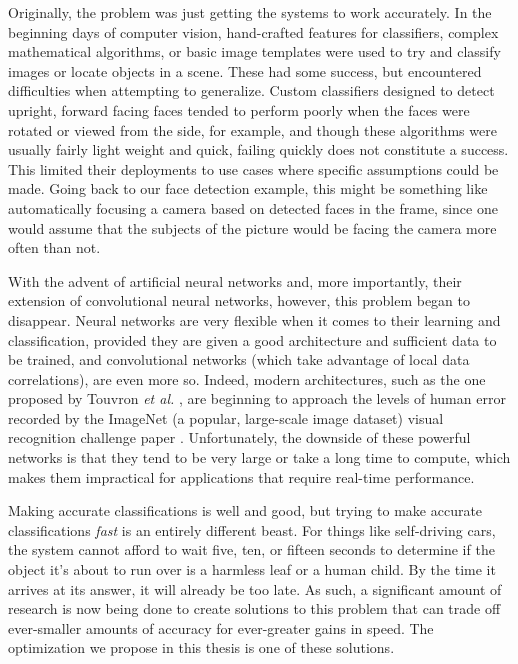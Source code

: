 \documentclass[11pt,a4paper,oldfontcommands]{memoir}
\begin{document}
Originally, the problem was just getting the systems to work accurately. In the beginning days of computer vision, hand-crafted features for classifiers, complex mathematical algorithms, or basic image templates were used to try and classify images or locate objects in a scene. These had some success, but encountered difficulties when attempting to generalize. Custom classifiers designed to detect upright, forward facing faces tended to perform poorly when the faces were rotated or viewed from the side, for example, and though these algorithms were usually fairly light weight and quick, failing quickly does not constitute a success. This limited their deployments to use cases where specific assumptions could be made. Going back to our face detection example, this might be something like automatically focusing a camera based on detected faces in the frame, since one would assume that the subjects of the picture would be facing the camera more often than not. 

With the advent of artificial neural networks and, more importantly, their extension of convolutional neural networks, however, this problem began to disappear. Neural networks are very flexible when it comes to their learning and classification, provided they are given a good architecture and sufficient data to be trained, and convolutional networks (which take advantage of local data correlations), are even more so. Indeed, modern architectures, such as the one proposed by Touvron \textit{et al.} \cite{fix}, are beginning to approach the levels of human error recorded by the ImageNet (a popular, large-scale image dataset) visual recognition challenge paper \cite{VGG16_challenge}. Unfortunately, the downside of these powerful networks is that they tend to be very large or take a long time to compute, which makes them impractical for applications that require real-time performance. 

Making accurate classifications is well and good, but trying to make accurate classifications \textit{fast} is an entirely different beast. For things like self-driving cars, the system cannot afford to wait five, ten, or fifteen seconds to determine if the object it's about to run over is a harmless leaf or a human child. By the time it arrives at its answer, it will already be too late. As such, a significant amount of research is now being done to create solutions to this problem that can trade off ever-smaller amounts of accuracy for ever-greater gains in speed. The optimization we propose in this thesis is one of these solutions. 
\end{document}
